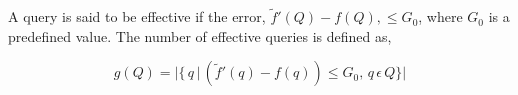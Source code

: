 A query is said to be effective if the error, $\tilde{f}'(Q) - f(Q), \leq G_0$,  where $G_0$ is a predefined value. The number of effective queries is defined as,

\begin{equation}
    g(Q) =  |\{\,q\, | \, (\tilde{f}'(q) - f(q)) \leq G_0, \,q\, \epsilon \,Q\}|
\end{equation}



